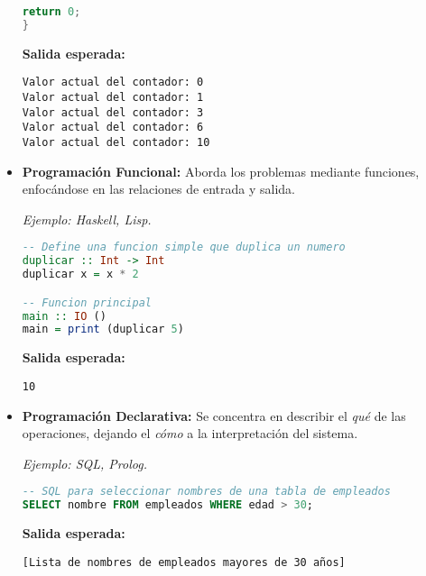 \documentclass{report}
\begin{document}
\begin{itemize}
\begin{minipage}{\linewidth}
\begin{lstlisting}[language=C, caption=Ejemplo de Programacion Imperativa en C]
    return 0;
}
\end{lstlisting}

\textbf{Salida esperada:}
\begin{verbatim}
Valor actual del contador: 0
Valor actual del contador: 1
Valor actual del contador: 3
Valor actual del contador: 6
Valor actual del contador: 10
\end{verbatim}
\end{minipage} %

\item \textbf{Programación Funcional:} Aborda los problemas mediante funciones, enfocándose en las relaciones de entrada y salida. 

\textit{Ejemplo: Haskell, Lisp.}

\begin{minipage}{\linewidth} %
\begin{lstlisting}[language=Haskell, caption=Ejemplo de Programacion Funcional en Haskell]
-- Define una funcion simple que duplica un numero
duplicar :: Int -> Int
duplicar x = x * 2

-- Funcion principal
main :: IO ()
main = print (duplicar 5)
\end{lstlisting}

\textbf{Salida esperada:}
\begin{verbatim}
10
\end{verbatim}
\end{minipage} %

\item \textbf{Programación Declarativa:} Se concentra en describir el \textit{qué} de las operaciones, dejando el \textit{cómo} a la interpretación del sistema. 

\textit{Ejemplo: SQL, Prolog.}

\begin{minipage}{\linewidth} %
\begin{lstlisting}[language=SQL, caption=Ejemplo de Programacion Declarativa en SQL]
-- SQL para seleccionar nombres de una tabla de empleados
SELECT nombre FROM empleados WHERE edad > 30;
\end{lstlisting}

\textbf{Salida esperada:}
\begin{verbatim}
[Lista de nombres de empleados mayores de 30 años]
\end{verbatim}
\end{minipage} %


\end{itemize}
\end{document}
